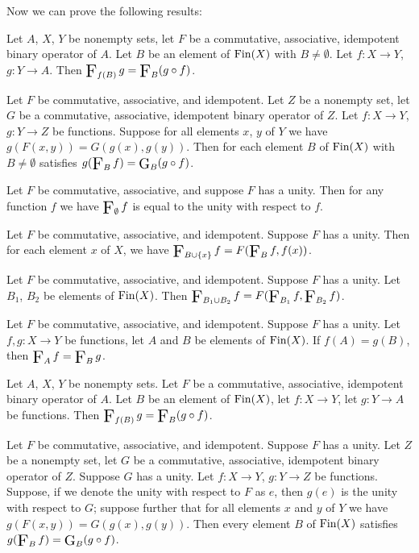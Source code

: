 \documentclass{article}
\begin{document}
Now we can prove the following results:
\begin{thm}
\item\label{setwiseo:29} Let $A$, $X$, $Y$ be nonempty sets,
  let $F$ be a commutative, associative, idempotent binary operator of $A$.
  Let $B$ be an element of $\operatorname{Fin}(X)$ with $B\neq\emptyset$.
  Let $f\colon X\to Y$, $g\colon Y\to A$.
  Then $\iteratedBinop{F}_{f(B)}g=\iteratedBinop{F}_{B}(g\circ f)$.
\item\label{setwiseo:30} Let $F$ be commutative, associative, and idempotent.
  Let $Z$ be a nonempty set, let $G$ be a commutative, associative,
  idempotent binary operator of $Z$. Let $f\colon X\to Y$, $g\colon Y\to Z$
  be functions. Suppose for all elements $x$, $y$ of $Y$ we have $g(F(x,y))=G(g(x),g(y))$.
  Then for each element $B$ of $\operatorname{Fin}(X)$ with $B\neq\emptyset$ satisfies
  $g(\iteratedBinop{F}_{B}f)=\iteratedBinop{G}_{B}(g\circ f)$.
\item\label{setwiseo:31} Let $F$ be commutative, associative, and
  suppose $F$ has a unity. Then for any function $f$ we have
  $\iteratedBinop{F}_{\emptyset}f$ is equal to the unity with respect to $f$.
\item\label{setwiseo:32} Let $F$ be commutative, associative, and idempotent.
  Suppose $F$ has a unity.
  Then for each element $x$ of $X$, we have
  $\iteratedBinop{F}_{B\cup\{x\}}f=F(\iteratedBinop{F}_{B}f,f(x))$.
\item\label{setwiseo:33} Let $F$ be commutative, associative, and idempotent.
  Suppose $F$ has a unity.
  Let $B_{1}$, $B_{2}$ be elements of $\operatorname{Fin}(X)$.
  Then $\iteratedBinop{F}_{B_{1}\cup B_{2}}f=F(\iteratedBinop{F}_{B_{1}}f,\iteratedBinop{F}_{B_{2}}f)$.
\item\label{setwiseo:34} Let $F$ be commutative, associative, and idempotent.
  Suppose $F$ has a unity.
  Let $f,g\colon X\to Y$ be functions, let $A$ and $B$ be elements of $\operatorname{Fin}(X)$.
  If $f(A)=g(B)$, then $\iteratedBinop{F}_{A}f=\iteratedBinop{F}_{B}g$.
\item\label{setwiseo:35} Let $A$, $X$, $Y$ be nonempty sets. Let $F$ be
  a commutative, associative, idempotent binary operator of $A$.
  Let $B$ be an element of $\operatorname{Fin}(X)$, let $f\colon X\to Y$,
  let $g\colon Y\to A$ be functions.
  Then $\iteratedBinop{F}_{f(B)}g=\iteratedBinop{F}_{B}(g\circ f)$.
\item\label{setwiseo:36} Let $F$ be commutative, associative, and idempotent.
  Suppose $F$ has a unity.
  Let $Z$ be a nonempty set, let $G$ be a commutative, associative,
  idempotent binary operator of $Z$. Suppose $G$ has a unity.
  Let $f\colon X\to Y$, $g\colon Y\to Z$ be functions.
  Suppose, if we denote the unity with respect to $F$ as $e$, then
  $g(e)$ is the unity with respect to $G$; suppose further that for all
  elements $x$ and $y$ of $Y$ we have $g(F(x,y))=G(g(x),g(y))$.
  Then every element $B$ of $\operatorname{Fin}(X)$ satisfies
  $g(\iteratedBinop{F}_{B}f) = \iteratedBinop{G}_{B}(g\circ f)$.
\end{thm}
\end{document}
